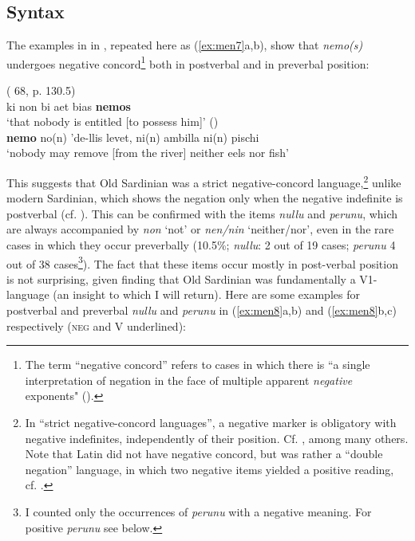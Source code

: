\documentclass[output=paper,colorlinks,citecolor=brown]{langscibook}
\begin{document}
\subsection{Syntax}\label{sec:men3.2}
The examples in  in , repeated here as (\ref{ex:men7}a,b), show that \textit{nemo(s)} undergoes negative concord\footnote{The term “negative concord” refers to cases in which there is “a single interpretation of negation in the face of multiple apparent \textit{negative} exponents" (\cite[][458]{Giannakidou2020}).} both in postverbal and in preverbal position:

\ea\label{ex:men7}
    \ea ( 68, p. 130.5)\\
    ki non bi aet bias \textbf{nemos}\\
    ‘that nobody is entitled [to possess him]’
    \ex ()\\
    \textbf{nemo} no(n) 'de-llis levet, ni(n) ambilla ni(n) pischi\\
    ‘nobody may remove [from the river] neither eels nor fish’
\z
\z

This suggests that Old Sardinian was a strict negative-concord language,\footnote{In “strict negative-concord languages”, a negative marker is obligatory with negative indefinites, independently of their position. Cf. \citet{Giannakidou2000, Giannakidou2006}, among many others. Note that Latin did not have negative concord, but was rather a “double negation” language, in which two negative items yielded a positive reading, cf. \citet{Gianollo2016}.} unlike modern Sardinian, which shows the negation only when the negative indefinite is postverbal (cf. \cite[][23]{Jones1993}). This can be confirmed with the items \textit{nullu} and \textit{perunu}, which are always accompanied by \textit{non} ‘not’ or \textit{nen/nin} ‘neither/nor’, even in the rare cases in which they occur preverbally (10.5\%; \textit{nullu}: 2 out of 19 cases; \textit{perunu} 4 out of 38 cases\footnote{I counted only the occurrences of \textit{perunu} with a negative meaning. For positive \textit{perunu} see below.}). The fact that these items occur mostly in post-verbal position is not surprising, given \citet{Wolfe2015} finding that Old Sardinian was fundamentally a V1-language (an insight to which I will return). Here are some examples for postverbal and preverbal \textit{nullu} and \textit{perunu} in (\ref{ex:men8}a,b) and (\ref{ex:men8}b,c) respectively (\textsc{neg} and V underlined):\largerpage[-1]\pagebreak
\end{document}
